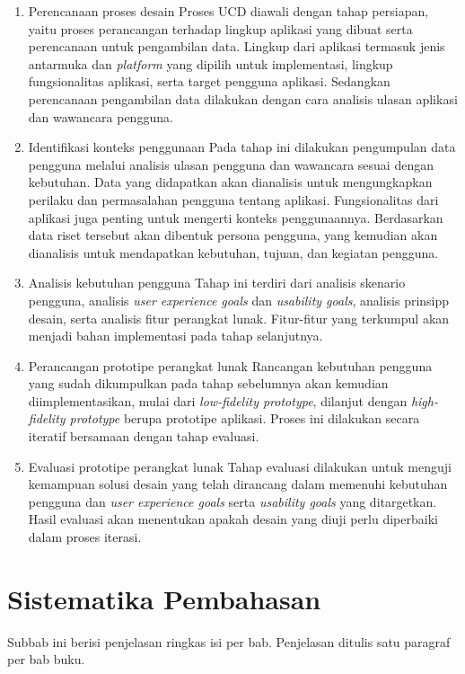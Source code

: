 \begin{enumerate}
  \item Perencanaan proses desain
  \subitem Proses UCD diawali dengan tahap persiapan, yaitu proses perancangan terhadap lingkup aplikasi yang dibuat serta perencanaan untuk pengambilan data. Lingkup dari aplikasi termasuk jenis antarmuka dan \textit{platform} yang dipilih untuk implementasi, lingkup fungsionalitas aplikasi, serta target pengguna aplikasi. Sedangkan perencanaan pengambilan data dilakukan dengan cara analisis ulasan aplikasi dan wawancara pengguna.

  \item Identifikasi konteks penggunaan
  \subitem Pada tahap ini dilakukan pengumpulan data pengguna melalui analisis ulasan pengguna dan wawancara sesuai dengan kebutuhan. Data yang didapatkan akan dianalisis untuk mengungkapkan perilaku dan permasalahan pengguna tentang aplikasi. Fungsionalitas dari aplikasi juga penting untuk mengerti konteks penggunaannya. Berdasarkan data riset tersebut akan dibentuk persona pengguna, yang kemudian akan dianalisis untuk mendapatkan kebutuhan, tujuan, dan kegiatan pengguna.
   
  \item Analisis kebutuhan pengguna
  \subitem Tahap ini terdiri dari analisis skenario pengguna, analisis \textit{user experience goals} dan \textit{usability goals}, analisis prinsipp desain, serta analisis fitur perangkat lunak. Fitur-fitur yang terkumpul akan menjadi bahan implementasi pada tahap selanjutnya.
  
  \item Perancangan prototipe perangkat lunak
  \subitem Rancangan kebutuhan pengguna yang sudah dikumpulkan pada tahap sebelumnya akan kemudian diimplementasikan, mulai dari \textit{low-fidelity prototype}, dilanjut dengan \textit{high-fidelity prototype} berupa prototipe aplikasi. Proses ini dilakukan secara iteratif bersamaan dengan tahap evaluasi.
  
  \item Evaluasi prototipe perangkat lunak
  \subitem Tahap evaluasi dilakukan untuk menguji kemampuan solusi desain yang telah dirancang dalam memenuhi kebutuhan pengguna dan \textit{user experience goals} serta \textit{usability goals} yang ditargetkan. Hasil evaluasi akan menentukan apakah desain yang diuji perlu diperbaiki dalam proses iterasi.
  
\end{enumerate}


\section{Sistematika Pembahasan}

Subbab ini berisi penjelasan ringkas isi per bab. Penjelasan ditulis satu paragraf per bab buku.
